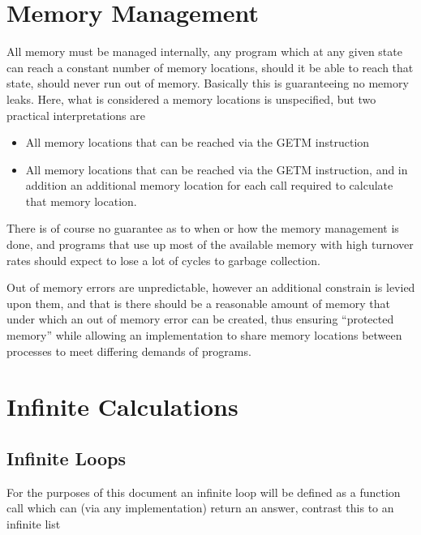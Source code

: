 \documentclass[12pt,letterpaper]{report}
\begin{document}
\section{Memory Management}
All memory must be managed internally, any program which at any given state can reach a constant number of memory locations, should it be able to reach that state, should never run out of memory. Basically this is guaranteeing no memory leaks. Here, what is considered a memory locations is unspecified, but two practical interpretations are
\begin{itemize}
\item All memory locations that can be reached via the GETM instruction
\item All memory locations that can be reached via the GETM instruction, and in addition an additional memory location for each call required to calculate that memory location.
\end{itemize}
There is of course no guarantee as to when or how the memory management is done, and programs that use up most of the available memory with high turnover rates should expect to lose a lot of cycles to garbage collection.

Out of memory errors are unpredictable, however an additional constrain is levied upon them, and that is there should be a reasonable amount of memory that under which an out of memory error can be created, thus ensuring ``protected memory'' while allowing an implementation to share memory locations between processes to meet differing demands of programs.
\section{Infinite Calculations}
\subsection{Infinite Loops}
For the purposes of this document an infinite loop will be defined as a function call which can (via any implementation) return an answer, contrast this to an infinite list
\end{document}
